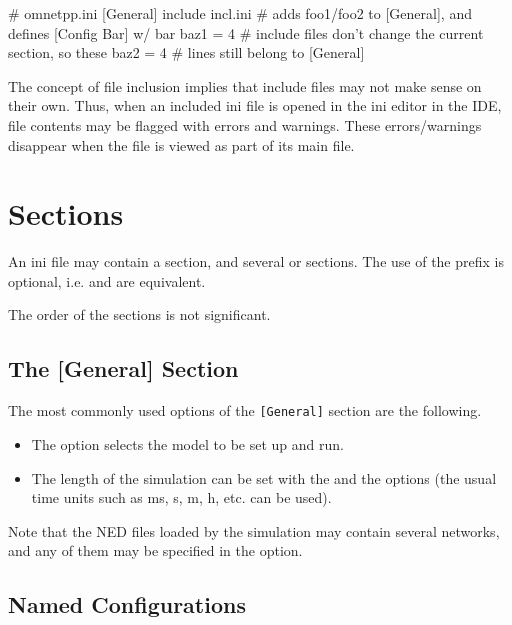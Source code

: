 \begin{inifile}
# omnetpp.ini
[General]
include incl.ini  # adds foo1/foo2 to [General], and defines [Config Bar] w/ bar
baz1 = 4          # include files don't change the current section, so these
baz2 = 4          # lines still belong to [General]
\end{inifile}

\begin{note}
The concept of file inclusion implies that include files may not make sense
on their own. Thus, when an included ini file is opened in the ini editor
in the IDE, file contents may be flagged with errors and warnings. These
errors/warnings disappear when the file is viewed as part of its main file.
\end{note}


\section{Sections}
\label{sec:config-sim:sections}

An ini file may contain a \ttt{[General]} section, and several
\ttt{[<configname>]} or  sections. The use of the
 prefix is optional, i.e. \ttt{[Foo]} and  are
equivalent.

The order of the sections is not significant.


\subsection{The [General] Section}
\label{sec:config-sim:general-section}

The most commonly used options of the \texttt{[General]} section are the
following.

\begin{itemize}
  \item The  option selects the model to be set up and run.
  \item The length of the simulation can be set with the
     and the  options (the
    usual time units such as ms, s, m, h, etc. can be used).
\end{itemize}

Note that the NED files loaded by the simulation may contain several
networks, and any of them may be specified in the 
option.


\subsection{Named Configurations}
\label{sec:config-sim:named-configurations}

